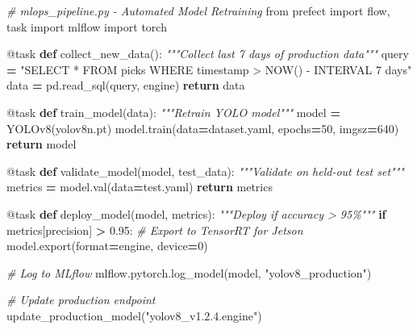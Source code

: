 \documentclass[
]{article}
\newenvironment{Shaded}{\begin{snugshade}}{\end{snugshade}}
\newcommand{\AttributeTok}[1]{\textcolor[rgb]{0.13,0.29,0.53}{#1}}
\newcommand{\BuiltInTok}[1]{#1}
\newcommand{\CommentTok}[1]{\textcolor[rgb]{0.56,0.35,0.01}{\textit{#1}}}
\newcommand{\ControlFlowTok}[1]{\textcolor[rgb]{0.13,0.29,0.53}{\textbf{#1}}}
\newcommand{\DecValTok}[1]{\textcolor[rgb]{0.00,0.00,0.81}{#1}}
\newcommand{\FloatTok}[1]{\textcolor[rgb]{0.00,0.00,0.81}{#1}}
\newcommand{\ImportTok}[1]{#1}
\newcommand{\KeywordTok}[1]{\textcolor[rgb]{0.13,0.29,0.53}{\textbf{#1}}}
\newcommand{\NormalTok}[1]{#1}
\newcommand{\OperatorTok}[1]{\textcolor[rgb]{0.81,0.36,0.00}{\textbf{#1}}}
\newcommand{\StringTok}[1]{\textcolor[rgb]{0.31,0.60,0.02}{#1}}
\begin{document}
\begin{Shaded}
\begin{Highlighting}[]
\CommentTok{\# mlops\_pipeline.py {-} Automated Model Retraining}
\ImportTok{from}\NormalTok{ prefect }\ImportTok{import}\NormalTok{ flow, task}
\ImportTok{import}\NormalTok{ mlflow}
\ImportTok{import}\NormalTok{ torch}

\AttributeTok{@task}
\KeywordTok{def}\NormalTok{ collect\_new\_data():}
    \CommentTok{"""Collect last 7 days of production data"""}
\NormalTok{    query }\OperatorTok{=} \StringTok{"SELECT * FROM picks WHERE timestamp \textgreater{} NOW() {-} INTERVAL \textquotesingle{}7 days\textquotesingle{}"}
\NormalTok{    data }\OperatorTok{=}\NormalTok{ pd.read\_sql(query, engine)}
    \ControlFlowTok{return}\NormalTok{ data}

\AttributeTok{@task}
\KeywordTok{def}\NormalTok{ train\_model(data):}
    \CommentTok{"""Retrain YOLO model"""}
\NormalTok{    model }\OperatorTok{=}\NormalTok{ YOLOv8(}\StringTok{\textquotesingle{}yolov8n.pt\textquotesingle{}}\NormalTok{)}
\NormalTok{    model.train(data}\OperatorTok{=}\StringTok{\textquotesingle{}dataset.yaml\textquotesingle{}}\NormalTok{, epochs}\OperatorTok{=}\DecValTok{50}\NormalTok{, imgsz}\OperatorTok{=}\DecValTok{640}\NormalTok{)}
    \ControlFlowTok{return}\NormalTok{ model}

\AttributeTok{@task}
\KeywordTok{def}\NormalTok{ validate\_model(model, test\_data):}
    \CommentTok{"""Validate on held{-}out test set"""}
\NormalTok{    metrics }\OperatorTok{=}\NormalTok{ model.val(data}\OperatorTok{=}\StringTok{\textquotesingle{}test.yaml\textquotesingle{}}\NormalTok{)}
    \ControlFlowTok{return}\NormalTok{ metrics}

\AttributeTok{@task}
\KeywordTok{def}\NormalTok{ deploy\_model(model, metrics):}
    \CommentTok{"""Deploy if accuracy \textgreater{} 95\%"""}
    \ControlFlowTok{if}\NormalTok{ metrics[}\StringTok{\textquotesingle{}precision\textquotesingle{}}\NormalTok{] }\OperatorTok{\textgreater{}} \FloatTok{0.95}\NormalTok{:}
        \CommentTok{\# Export to TensorRT for Jetson}
\NormalTok{        model.export(}\BuiltInTok{format}\OperatorTok{=}\StringTok{\textquotesingle{}engine\textquotesingle{}}\NormalTok{, device}\OperatorTok{=}\DecValTok{0}\NormalTok{)}

        \CommentTok{\# Log to MLflow}
\NormalTok{        mlflow.pytorch.log\_model(model, }\StringTok{"yolov8\_production"}\NormalTok{)}

        \CommentTok{\# Update production endpoint}
\NormalTok{        update\_production\_model(}\StringTok{"yolov8\_v1.2.4.engine"}\NormalTok{)}


\end{Highlighting}
\end{Shaded}
\end{document}
